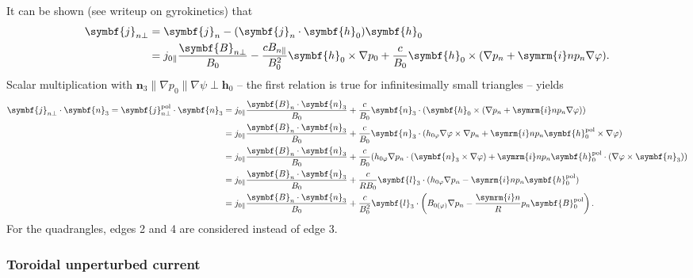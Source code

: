 \documentclass[a4paper, 10pt, english]{article}
\let\temp\vartheta
\let\vartheta\theta
\let\theta\temp
\let\temp\varphi
\let\varphi\phi
\let\phi\temp
\let\vec\symbf
\newcommand*\im{\ensuremath{\symrm{i}}}
\newcommand*\pol{\ensuremath{\textrm{pol}}}
\begin{document}
It can be shown (see writeup on gyrokinetics) that
\begin{align}
  \vec{j}_{n \perp} &= \vec{j}_{n} - (\vec{j}_{n} \cdot \vec{h}_{0}) \vec{h}_{0} \nonumber \\
  &= j_{0 \parallel} \frac{\vec{B}_{n \perp}}{B_{0}} - \frac{c B_{n \parallel}}{B_{0}^{2}} \vec{h}_{0} \times \nabla p_{0} + \frac{c}{B_{0}} \vec{h}_{0} \times (\nabla p_{n} + \im n p_{n} \nabla \phi).
\end{align}
Scalar multiplication with $\vec{n}_{3} \parallel \nabla p_{0} \parallel \nabla \psi \perp \vec{h}_{0}$ -- the first relation is true for infinitesimally small triangles -- yields
\begin{align}
  \vec{j}_{n \perp} \cdot \vec{n}_{3} = \vec{j}_{n \perp}^{\pol} \cdot \vec{n}_{3} &= j_{0 \parallel} \frac{\vec{B}_{n} \cdot \vec{n}_{3}}{B_{0}} + \frac{c}{B_{0}} \vec{n}_{3} \cdot (\vec{h}_{0} \times (\nabla p_{n} + \im n p_{n} \nabla \phi)) \nonumber \\
  &= j_{0 \parallel} \frac{\vec{B}_{n} \cdot \vec{n}_{3}}{B_{0}} + \frac{c}{B_{0}} \vec{n}_{3} \cdot (h_{0 \phi} \nabla \phi \times \nabla p_{n} + \im n p_{n} \vec{h}_{0}^{\pol} \times \nabla \phi) \nonumber \\
  &= j_{0 \parallel} \frac{\vec{B}_{n} \cdot \vec{n}_{3}}{B_{0}} + \frac{c}{B_{0}} (h_{0 \phi} \nabla p_{n} \cdot (\vec{n}_{3} \times \nabla \phi) + \im n p_{n} \vec{h}_{0}^{\pol} \cdot (\nabla \phi \times \vec{n}_{3})) \nonumber \\
  &= j_{0 \parallel} \frac{\vec{B}_{n} \cdot \vec{n}_{3}}{B_{0}} + \frac{c}{R B_{0}} \vec{l}_{3} \cdot (h_{0 \phi} \nabla p_{n} - \im n p_{n} \vec{h}_{0}^{\pol}) \nonumber \\
  &= j_{0 \parallel} \frac{\vec{B}_{n} \cdot \vec{n}_{3}}{B_{0}} + \frac{c}{B_{0}^{2}} \vec{l}_{3} \cdot \left( B_{0 (\phi)} \nabla p_{n} - \frac{\im n}{R} p_{n} \vec{B}_{0}^{\pol} \right). \label{eq:I3}
\end{align}
For the quadrangles, edges 2 and 4 are considered instead of edge 3.

\subsubsection{Toroidal unperturbed current}
\end{document}
